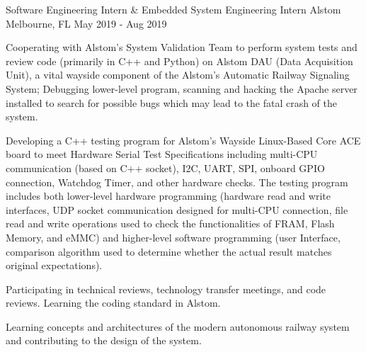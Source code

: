\begin{cventries}
  \cventry
    {Software Engineering Intern \& Embedded System Engineering Intern} %
    {Alstom} %
    {Melbourne, FL} %
    {May 2019 - Aug 2019} %
    {
      \begin{cvitems} %
        \item {Cooperating with Alstom's System Validation Team to perform system tests and review code (primarily in C++ and Python) on Alstom DAU (Data Acquisition Unit), a vital wayside component of the Alstom's Automatic Railway Signaling System; Debugging lower-level program, scanning and hacking the Apache server installed to search for possible bugs which may lead to the fatal crash of the system.}
        \item {Developing a C++ testing program for Alstom's Wayside Linux-Based Core ACE board to meet Hardware Serial Test Specifications including multi-CPU communication (based on C++ socket), I2C, UART, SPI, onboard GPIO connection, Watchdog Timer, and other hardware checks. The testing program includes both lower-level hardware programming (hardware read and write interfaces, UDP socket communication designed for multi-CPU connection, file read and write operations used to check the functionalities of FRAM, Flash Memory, and eMMC) and higher-level software programming (user Interface, comparison algorithm used to determine whether the actual result matches original expectations).}
        \item {Participating in technical reviews, technology transfer meetings, and code reviews. Learning the coding standard in Alstom.}
        \item {Learning concepts and architectures of the modern autonomous railway system and contributing to the design of the system.}
      \end{cvitems}
    }

\end{cventries}
